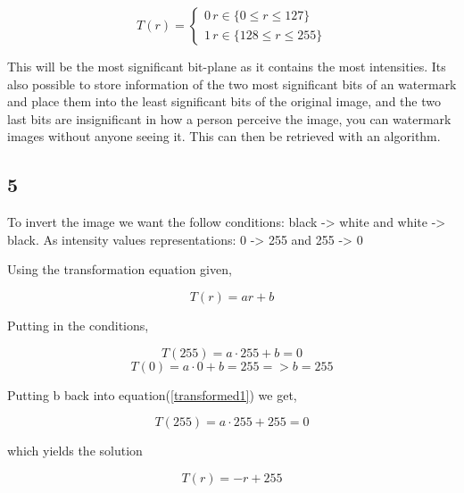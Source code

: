 {    \begin{equation}
        T(r) =  \begin{cases} 
            0 \, r\in\{0\leq r \leq 127 \} \\
            1 \, r\in\{128\leq r \leq 255 \}
         \end{cases}
    \end{equation}
    
    This will be the most significant bit-plane as it contains the most intensities. Its also possible to store information of the two most significant bits of an watermark and place them into the least significant bits of the original image, and the two last bits are insignificant in how a person perceive the image, you can watermark images without anyone seeing it. This can then be retrieved with an algorithm.
    
    
    \subsection{5}
    
    To invert the image we want the follow conditions: black -> white and white -> black.
    As intensity values representations: 0 -> 255 and 255 -> 0
    
    Using the transformation equation given,
    
    \begin{equation*}
        T(r) = ar + b
    \end{equation*}
    
    Putting in the conditions,
    
    \begin{equation}
        T(255) = a\cdot 255 + b = 0
        \label{transformed1}
    \end{equation}
    \begin{equation*}
        T(0) = a\cdot 0 + b = 255 => b = 255
    \end{equation*}
    
    Putting b back into equation(\ref{transformed1}) we get,
    
    \begin{equation*}
        T(255) = a\cdot 255 + 255 = 0
    \end{equation*}
    
    which yields the solution
    
    \begin{equation}
        T(r) = -r + 255
    \end{equation}


}
